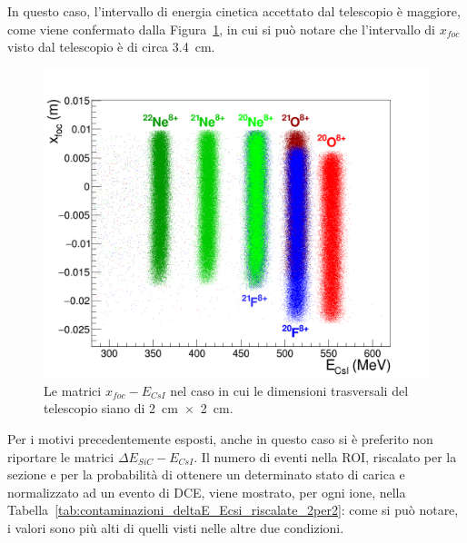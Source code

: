 In questo caso, l'intervallo di energia cinetica accettato dal telescopio è maggiore, come viene confermato dalla Figura~\ref{fig:xf_ecsi_2per2}, in cui si può notare che l'intervallo di $x_{foc}$ visto dal telescopio è di circa 3.4~cm.
\begin{figure} [!p]
	\centering
	\includegraphics[width=\textwidth, keepaspectratio]{Grafici_Tesi2/2per2new/xf_ecsi_quadrata_menoeventi.png}
	\caption{Le matrici $x_{foc} - E_{CsI}$ nel caso in cui le dimensioni trasversali del telescopio siano di 2~cm~$\times$~2~cm.} \label{fig:xf_ecsi_2per2}
\end{figure} 
Per i motivi precedentemente esposti, anche in questo caso si è preferito non riportare le matrici $\Delta E_{SiC} - E_{CsI}$.
Il numero di eventi nella ROI, riscalato per la sezione e per la probabilità di ottenere un determinato stato di carica e normalizzato ad un evento di DCE, viene mostrato, per ogni ione, nella Tabella~\ref{tab:contaminazioni_deltaE_Ecsi_riscalate_2per2}: come si può notare, i valori sono più alti di quelli visti nelle altre due condizioni.
